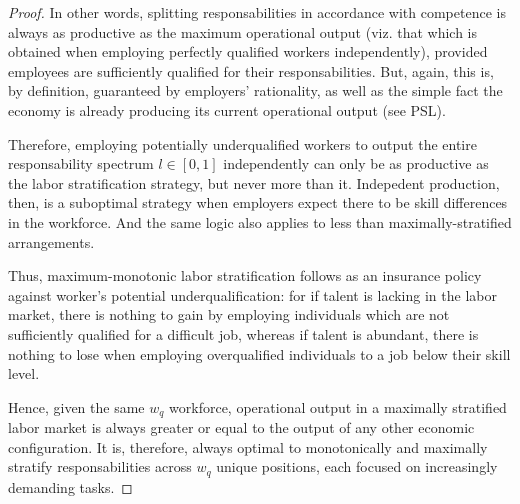 \documentclass[hidelinks, nonatbib]{elsarticle}
\begin{document}
\begin{lemma}
\begin{proof}
        In other words, splitting responsabilities in accordance with competence is always as productive as the maximum operational output (viz. that which is obtained when employing perfectly qualified workers independently), provided employees are sufficiently qualified for their responsabilities. But, again, this is, by definition, guaranteed by employers' rationality, as well as the simple fact the economy is already producing its current operational output (see PSL). 
        
        Therefore, employing potentially underqualified workers to output the entire responsability spectrum $l \in [0,1]$ independently can only be as productive as the labor stratification strategy, but never more than it. Indepedent production, then, is a suboptimal strategy when employers expect there to be skill differences in the workforce. And the same logic also applies to less than maximally-stratified arrangements.
        
        Thus, maximum-monotonic labor stratification follows as an insurance policy against worker's potential underqualification: for if talent is lacking in the labor market, there is nothing to gain by employing individuals which are not sufficiently qualified for a difficult job, whereas if talent is abundant, there is nothing to lose when employing overqualified individuals to a job below their skill level.

        Hence, given the same $w_q$ workforce, operational output in a maximally stratified labor market is always greater or equal to the output of any other economic configuration. It is, therefore, always optimal to monotonically and maximally stratify responsabilities across $w_q$ unique positions, each focused on increasingly demanding tasks.
    \end{proof}
\end{lemma}
\end{document}

